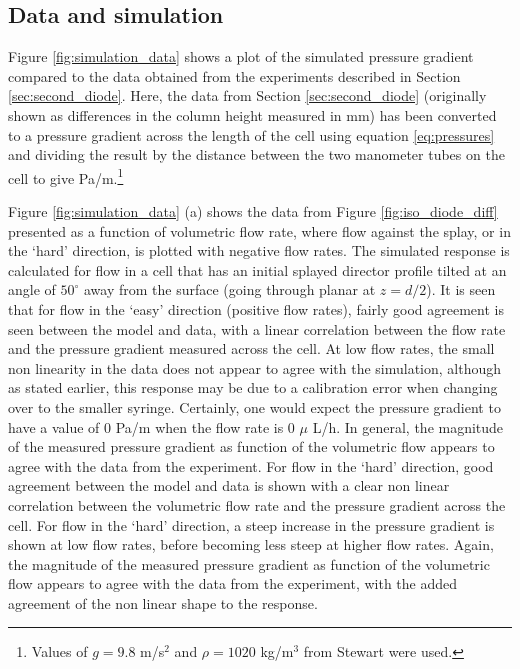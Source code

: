 \subsection{Data and simulation}
Figure \ref{fig:simulation_data} shows a plot of the simulated pressure gradient compared to the data obtained from the experiments described in Section \ref{sec:second_diode}. Here, the data from Section \ref{sec:second_diode} (originally shown as differences in the column height measured in mm) has been converted to a pressure gradient across the length of the cell using equation \ref{eq:pressures} and dividing the result by the distance between the two manometer tubes on the cell to give Pa/m.\footnote{Values of $g=9.8$ m/s$^2$ and $\rho=1020$ kg/m$^3$ from Stewart \cite{Stewart2004} were used.} 

Figure \ref{fig:simulation_data} (a) shows the data from Figure \ref{fig:iso_diode_diff} presented as a function of volumetric flow rate, where flow against the splay, or in the `hard' direction, is plotted with negative flow rates. The simulated response is calculated for flow in a cell that has an initial splayed director profile tilted at an angle of $50^{\circ}$ away from the surface (going through planar at $z=d/2$). It is seen that for flow in the `easy' direction (positive flow rates), fairly good agreement is seen between the model and data, with a linear correlation between the flow rate and the pressure gradient measured across the cell. At low flow rates, the small non linearity in the data does not appear to agree with the simulation, although as stated earlier, this response may be due to a calibration error when changing over to the smaller syringe. Certainly, one would expect the pressure gradient to have a value of 0 Pa/m when the flow rate is 0 $\mu$ L/h. In general, the magnitude of the measured pressure gradient as  function of the volumetric flow appears to agree with the data from the experiment. For flow in the `hard' direction, good agreement between the model and data is shown with a clear non linear correlation between the volumetric flow rate and the pressure gradient across the cell. For flow in the `hard' direction,  a steep increase in the pressure gradient is shown at low flow rates, before becoming less steep at higher flow rates. Again, the magnitude of the measured pressure gradient as function of the volumetric flow appears to agree with the data from the experiment, with the added agreement of the non linear shape to the response.

